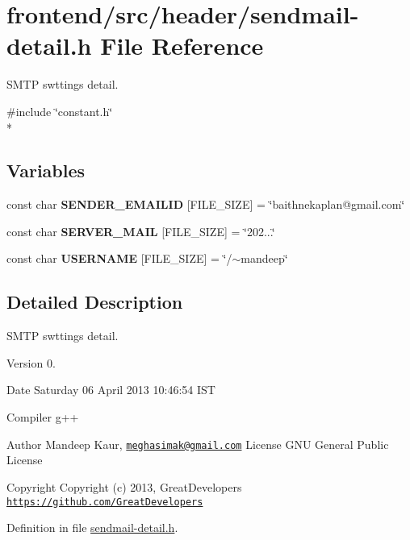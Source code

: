 \hypertarget{sendmail-detail_8h}{\section{frontend/src/header/sendmail-\/detail.h File Reference}
\label{sendmail-detail_8h}
}


S\-M\-T\-P swttings detail.  


{\ttfamily \#include \char`\"{}constant.\-h\char`\"{}}\\*
\subsection*{Variables}
\begin{DoxyCompactItemize}
\item 
\hypertarget{sendmail-detail_8h_a6a17dd6df02d3a5118873bc84ce9801d}{const char {\bfseries S\-E\-N\-D\-E\-R\-\_\-\-E\-M\-A\-I\-L\-I\-D} \mbox{[}F\-I\-L\-E\-\_\-\-S\-I\-Z\-E\mbox{]} = \char`\"{}baithnekaplan@gmail.\-com\char`\"{}}\label{sendmail-detail_8h_a6a17dd6df02d3a5118873bc84ce9801d}

\item 
\hypertarget{sendmail-detail_8h_a5a43d9760874d06771eec35419dad507}{const char {\bfseries S\-E\-R\-V\-E\-R\-\_\-\-M\-A\-I\-L} \mbox{[}F\-I\-L\-E\-\_\-\-S\-I\-Z\-E\mbox{]} = \char`\"{}202...\char`\"{}}\label{sendmail-detail_8h_a5a43d9760874d06771eec35419dad507}

\item 
\hypertarget{sendmail-detail_8h_af0dde2cd6a9fa974836b177b410e97fe}{const char {\bfseries U\-S\-E\-R\-N\-A\-M\-E} \mbox{[}F\-I\-L\-E\-\_\-\-S\-I\-Z\-E\mbox{]} = \char`\"{}/$\sim$mandeep\char`\"{}}\label{sendmail-detail_8h_af0dde2cd6a9fa974836b177b410e97fe}

\end{DoxyCompactItemize}


\subsection{Detailed Description}
S\-M\-T\-P swttings detail. \begin{DoxyVersion}{Version}
0. 
\end{DoxyVersion}
\begin{DoxyDate}{Date}
Saturday 06 April 2013 10\-:46\-:54 I\-S\-T\par
Compiler g++
\end{DoxyDate}
\begin{DoxyAuthor}{Author}
Mandeep Kaur, \href{mailto:meghasimak@gmail.com}{\tt meghasimak@gmail.\-com} License G\-N\-U General Public License 
\end{DoxyAuthor}
\begin{DoxyCopyright}{Copyright}
Copyright (c) 2013, Great\-Developers \href{https://github.com/GreatDevelopers}{\tt https\-://github.\-com/\-Great\-Developers} 
\end{DoxyCopyright}


Definition in file \hyperlink{sendmail-detail_8h_source}{sendmail-\/detail.\-h}.

